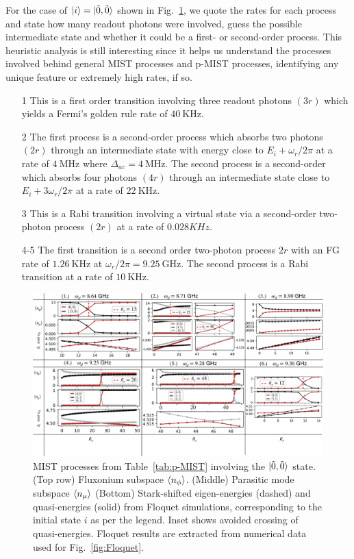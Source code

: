 \documentclass[%
reprint,
superscriptaddress,
 amsmath,amssymb,
 aps,
 prx,
longbibliography,
floatfix,
]{revtex4-2}
\begin{document}
For the case of $\ket{i}=\ket{\tilde{0},\tilde{0}}$ shown in Fig.~\ref{fig:Trans0}, we quote the rates for each process and state how many readout photons were involved, guess the possible intermediate state and whether it could be a first- or second-order process. This heuristic analysis is still interesting since it helps us understand the processes involved behind general MIST processes and p-MIST processes, identifying any unique feature or extremely high rates, if so. 
\begin{itemize}
    \item[1] This is a first order transition involving three readout photons $(3r)$ which yields a Fermi's golden rule rate of $40 \ \mathrm{KHz}$. 
    \item[2] The first process is a second-order process which absorbs two photons $(2r)$ through an intermediate state with energy close to $E_i+\omega_r/2\pi$ at a rate of $4 \ \mathrm{MHz}$ where $\Delta_{ac}=4 \ \mathrm{MHz}$. The second process is a second-order which absorbs four photons $(4r)$ through an intermediate state close to $E_i+3\omega_r/2\pi$ at a rate of $22 \ \mathrm{KHz}$. 
    \item[3] This is a Rabi transition involving a virtual state via a second-order two-photon process $(2r)$ at a rate of $0.028 KHz$. 
    \item[4-5] The first transition is a second order two-photon process $2r$ with an FG rate of $1.26 \ \mathrm{KHz}$ at $\omega_r/2\pi=9.25 \ \mathrm{GHz}$. The second process is a Rabi transition at a rate of $10 \ \mathrm{KHz}$. 
\end{itemize} 
\begin{figure}
    \centering
    \includegraphics[width=1.0\textwidth]{Figures/Trans0.pdf}
    \caption{MIST processes from Table~\ref{tab:p-MIST} involving the $\ket{\tilde{0},\tilde{0}}$ state. (Top row) Fluxonium subspace $\braket{n_\phi}$. (Middle) Parasitic mode subspace $\braket{n_\mu}$ (Bottom) Stark-shifted eigen-energies (dashed) and quasi-energies (solid) from Floquet simulations, corresponding to the initial state $i$ as per the legend. Inset shows avoided crossing of quasi-energies. Floquet results are extracted from numerical data used for Fig.~\ref{fig:Floquet}.}
    \label{fig:Trans0}
\end{figure}
\end{document}
